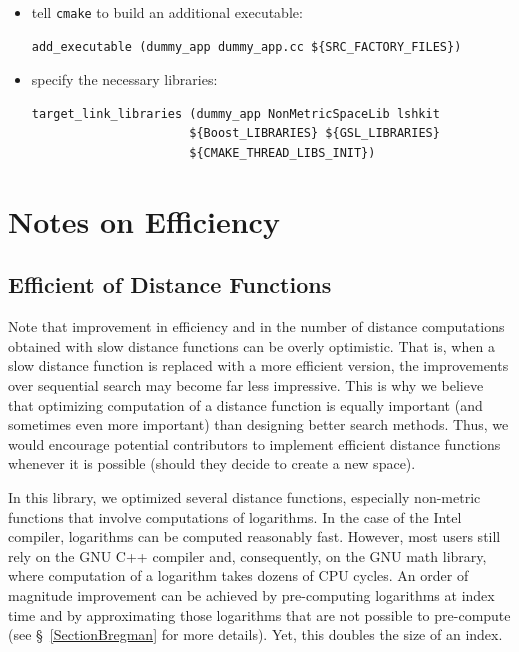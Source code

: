 \documentclass[runningheads,a4paper]{llncs}
\newcommand{\ttt}[1]{\texttt{#1}}
\begin{document}
{\begin{itemize}
\item tell \ttt{cmake} to build an additional executable:
\begin{verbatim}
add_executable (dummy_app dummy_app.cc ${SRC_FACTORY_FILES})
\end{verbatim}

\item specify the necessary libraries:
\begin{verbatim}
target_link_libraries (dummy_app NonMetricSpaceLib lshkit 
                      ${Boost_LIBRARIES} ${GSL_LIBRARIES} 
                      ${CMAKE_THREAD_LIBS_INIT})
\end{verbatim}
\end{itemize}

\section{Notes on Efficiency}\label{SectionEfficiency}
\subsection{Efficient of Distance Functions}
Note that improvement in efficiency and in the number of distance computations
obtained with slow distance functions can be overly optimistic.
That is, when a slow distance function is replaced with a more efficient version,
the improvements over sequential search may become far less impressive.
This is why we believe that optimizing  computation of a distance function 
is equally important (and sometimes even more important) 
than designing better search methods.
Thus, we would encourage potential contributors to 
implement efficient distance functions whenever it is possible 
(should they decide to create a new space).

In this library, we optimized several distance functions, 
especially non-metric functions that involve computations of logarithms.
In the case of the Intel compiler, logarithms can be computed reasonably fast.
However, most users still rely on the GNU C++ compiler and, consequently, on the GNU math library, 
where computation of a logarithm takes dozens of CPU cycles.
An order of magnitude improvement can be achieved by pre-computing 
logarithms at index time and by approximating those logarithms that are not possible
to pre-compute (see \S~\ref{SectionBregman} for more details).
Yet, this doubles the size of an index.

}
\end{document}
